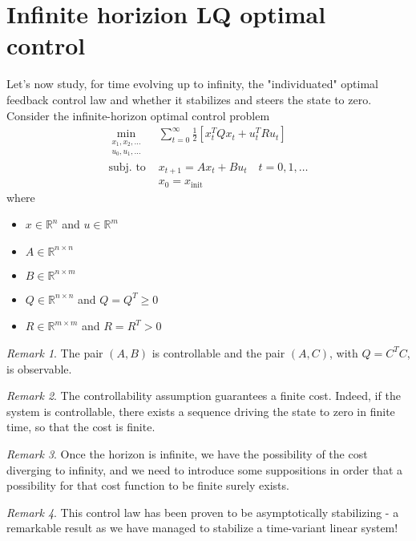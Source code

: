 \documentclass[openany]{book}
\newcommand{\R}{\mathbb{R}}               %
\theoremstyle{definition}
\theoremstyle{remark}
\newtheorem*{remark}{Remark}
\begin{document}
\section{Infinite horizion LQ optimal control}
Let's now study, for time evolving up to infinity, the "individuated" optimal feedback control law and whether it stabilizes and steers the state to zero.\\
Consider the infinite-horizon optimal control problem
\begin{align*}
        \min_{\substack{x_1,x_2,\dots \\ u_0,u_1,\dots}} & \displaystyle\sum_{t=0}^{\infty}\displaystyle\frac{1}{2}\left[x_t^TQx_t+u_t^TRu_t\right] \\
        \text{subj. to } & x_{t+1} = Ax_t + Bu_t \quad t=0,1,\dots\\
                        &x_0 = x_{\text{init}}
\end{align*}
where 
\begin{itemize}
    \item $x\in\R^n$ and $u\in\R^m$
    \item $A\in\R^{n\times n}$
    \item $B\in\R^{n\times m}$
    \item $Q\in\R^{n\times n}$ and $Q=Q^T\geq 0$
    \item $R\in\R^{m\times m}$ and $R=R^T> 0$
\end{itemize}

\begin{remark}
The pair $(A,B)$ is controllable and the pair $(A,C)$, with $Q=C^TC$, is observable.
\end{remark}

\begin{remark}
The controllability assumption guarantees a finite cost. Indeed, if the system is controllable, there exists a sequence driving the state to zero in finite time, so that the cost is finite.
\end{remark}

\begin{remark}
Once the horizon is infinite, we have the possibility of the cost diverging to infinity, and we need to introduce some suppositions in order that a possibility for that cost function to be finite surely exists.
\end{remark}

\begin{remark}
This control law has been proven to be asymptotically stabilizing - a remarkable result as we have managed to stabilize a time-variant linear system!
\end{remark}
\end{document}
